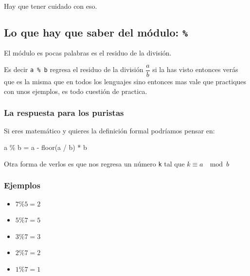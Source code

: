 \documentclass[12pt, fleqn]{report}                             %
\def \Eq {equation}                                             %
\newenvironment{MultiLineEquation*}[1]                          %
        {\begin{\Eq*}\begin{alignedat}{#1}}                         %
        {\end{alignedat}\end{\Eq*}}                                 %
\theoremstyle{break}                                            %
\newcommand{\textCode}[1]  { \texttt{#1} }                      %
\begin{document}
                Hay que tener cuidado con eso.

            \subsection{Lo que hay que saber del módulo: \textCode{\%}}
            
                El módulo es pocas palabras es el residuo de la división.

                Es decir \textCode{a \% b} regresa el residuo de la división $\dfrac{a}{b}$
                si la has visto entonces verás que es la misma que en todos los lenguajes
                sino entonces mas vale que practiques con unos ejemplos, es todo cuestión
                de practica.

                \subsubsection{La respuesta para los puristas}

                    Si eres matemático y quieres la definición formal podríamos pensar en:

                    \begin{MultiLineEquation*}{3}
                        a \% b = a - floor(a / b) \; * \; b
                    \end{MultiLineEquation*}

                    Otra forma de verlos es que nos regresa un número \textCode{k}
                    tal que $k \equiv a \; \mod b$

                \subsubsection{Ejemplos}
                
                    \begin{itemize}
                        \item $7 \% 5 = 2$
                        \item $5 \% 7 = 5$
                        \item $3 \% 7 = 3$
                        \item $2 \% 7 = 2$
                        \item $1 \% 7 = 1$
                    \end{itemize}
\end{document}
